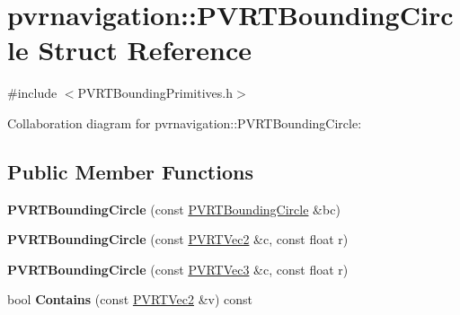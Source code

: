 \hypertarget{structpvrnavigation_1_1_p_v_r_t_bounding_circle}{\section{pvrnavigation\+:\+:P\+V\+R\+T\+Bounding\+Circle Struct Reference}
\label{structpvrnavigation_1_1_p_v_r_t_bounding_circle}
}


{\ttfamily \#include $<$P\+V\+R\+T\+Bounding\+Primitives.\+h$>$}



Collaboration diagram for pvrnavigation\+:\+:P\+V\+R\+T\+Bounding\+Circle\+:
\subsection*{Public Member Functions}
\begin{DoxyCompactItemize}
\item 
\hypertarget{structpvrnavigation_1_1_p_v_r_t_bounding_circle_af785f05ec587ddc88bbe4052efb4cbb6}{{\bfseries P\+V\+R\+T\+Bounding\+Circle} (const \hyperlink{structpvrnavigation_1_1_p_v_r_t_bounding_circle}{P\+V\+R\+T\+Bounding\+Circle} \&bc)}\label{structpvrnavigation_1_1_p_v_r_t_bounding_circle_af785f05ec587ddc88bbe4052efb4cbb6}

\item 
\hypertarget{structpvrnavigation_1_1_p_v_r_t_bounding_circle_a4f8de23dfc93b0dfab0001330d75674a}{{\bfseries P\+V\+R\+T\+Bounding\+Circle} (const \hyperlink{struct_p_v_r_t_vec2}{P\+V\+R\+T\+Vec2} \&c, const float r)}\label{structpvrnavigation_1_1_p_v_r_t_bounding_circle_a4f8de23dfc93b0dfab0001330d75674a}

\item 
\hypertarget{structpvrnavigation_1_1_p_v_r_t_bounding_circle_aee75bf4dca41352c5ce5b340268d6956}{{\bfseries P\+V\+R\+T\+Bounding\+Circle} (const \hyperlink{struct_p_v_r_t_vec3}{P\+V\+R\+T\+Vec3} \&c, const float r)}\label{structpvrnavigation_1_1_p_v_r_t_bounding_circle_aee75bf4dca41352c5ce5b340268d6956}

\item 
\hypertarget{structpvrnavigation_1_1_p_v_r_t_bounding_circle_a0d124f4b7ff576be9f451406add0d90d}{bool {\bfseries Contains} (const \hyperlink{struct_p_v_r_t_vec2}{P\+V\+R\+T\+Vec2} \&v) const }\label{structpvrnavigation_1_1_p_v_r_t_bounding_circle_a0d124f4b7ff576be9f451406add0d90d}

\end{DoxyCompactItemize}
